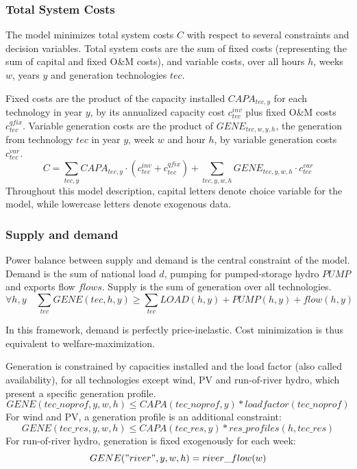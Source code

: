 \subsubsection{Total System Costs}

The model minimizes total system costs $C$ with respect to several constraints and decision variables. Total system costs are the sum of fixed costs (representing the sum of capital and fixed O\&M costs), and variable costs, over all hours $h$, weeks $w$, years $y$ and generation technologies $tec$. 

Fixed costs are the product of the capacity installed $CAPA_{tec,y}$ for each technology in year $y$, by its annualized capacity cost $c_{tec}^{inv}$ plus fixed O\&M costs $c_{tec}^{qfix}$. 
Variable generation costs are the product of $GENE_{tec,w,y,h}$, the generation from technology $tec$ in year $y$, week $w$ and hour $h$, by variable generation costs $c_{tec}^{var}$.
\begin{equation}
C =\sum_{tec,y} CAPA_{tec,y} \cdot ( c_{tec}^{inv} + c_{tec}^{qfix} ) + \sum_{tec,y,w,h} GENE_{tec,y,w,h} \cdot c_{tec}^{var}
\end{equation}
Throughout this model description, capital letters denote choice variable for the model, while lowercase letters denote exogenous data.

\subsubsection{Supply and demand}

Power balance between supply and demand is the central constraint of the model. Demand is the sum of national load $d$, pumping for pumped-storage hydro $PUMP$ and exports flow $flows$. 
Supply is the sum of generation over all technologies.
$$\forall h,y \quad \sum_{tec} GENE(tec,h,y) \geq \sum_{tec} LOAD(h,y) + PUMP(h,y) + flow(h,y)$$

In this framework, demand is perfectly price-inelastic. Cost minimization is thus equivalent to welfare-maximization.

Generation is constrained by capacities installed and the load factor (also called availability), for all technologies except wind, PV and run-of-river hydro, which present a specific generation profile.
$$GENE(tec\_noprof,y,w,h) \leq CAPA(tec\_noprof,y)*loadfactor(tec\_noprof)$$
For wind and PV, a generation profile is an additional constraint:
$$GENE(tec\_res,y,w,h) \leq CAPA(tec\_res,y)*res\_profiles(h,tec\_res)$$
For run-of-river hydro, generation is fixed exogenously for each week:
$$GENE("river",y,w,h) = river\_flow(w)$$


